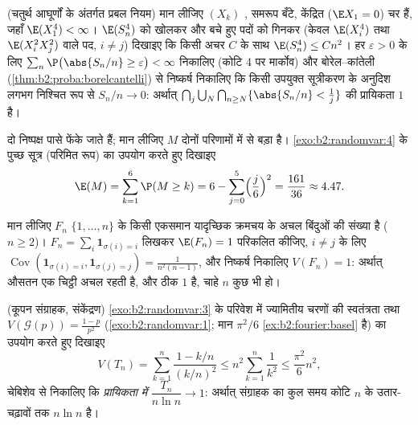 \begin{exercise}[$\star\star\star$]\label{exo:b2:randomvar:9}
(चतुर्थ आघूर्णों के अंतर्गत प्रबल नियम) मान लीजिए $(X_k)$ ,
समरूप बँटे, केंद्रित ($\E X_1 = 0$) चर हैं, जहाँ $\E(X_1^4) < \infty$। $\E(S_n^4)$ को खोलकर और बचे
हुए पदों को गिनकर (केवल $\E(X_i^4)$ तथा $\E(X_i^2X_j^2)$ वाले पद, $i
\neq j$) दिखाइए कि किसी
अचर $C$ के साथ $\E(S_n^4) \leq C n^2$। हर $\varepsilon > 0$ के लिए
$\sum_n \P\bigl(\abs{S_n/n} \geq \varepsilon\bigr) < \infty$
निकालिए (कोटि 4 पर मार्कोव) और बोरेल--कांतेली (\cref{thm:b2:proba:borelcantelli}) से निष्कर्ष
निकालिए कि किसी उपयुक्त सूत्रीकरण के अनुदिश लगभग निश्चित रूप से
$S_n/n \to 0$: अर्थात्  $\bigcap_{j}\bigcup_N\bigcap_{n \geq N}\{\abs{S_n/n} <
\frac1j\}$ की प्रायिकता $1$ है।
\end{exercise}

\begin{exercise}[$\star$]\label{exo:b2:randomvar:10}
दो निष्पक्ष पासे फेंके जाते हैं; मान लीजिए $M$ दोनों परिणामों में
से बड़ा है। \cref{exo:b2:randomvar:4} के पुच्छ सूत्र (परिमित रूप) का उपयोग करते हुए
दिखाइए
\[
\E(M) = \sum_{k=1}^{6}\P(M \geq k)
= 6 - \sum_{j=0}^5\Bigl(\frac j6\Bigr)^2 = \frac{161}{36}
\approx 4.47 .
\]
\end{exercise}

\begin{exercise}[$\star\star$]\label{exo:b2:randomvar:11}
मान लीजिए $F_n$ $\{1, \dots, n\}$ के किसी एकसमान यादृच्छिक क्रमचय के अचल बिंदुओं
की संख्या है ($n \geq 2$)। $F_n =
\sum_i\mathbf 1_{\sigma(i) = i}$ लिखकर $\E(F_n) = 1$ परिकलित कीजिए, $i \neq j$ के लिए $\operatorname{Cov}(\mathbf 1_{\sigma(i)=i}, \mathbf
1_{\sigma(j)=j}) = \frac1{n^2(n-1)}$,
और निष्कर्ष निकालिए $V(F_n) = 1$: अर्थात् औसतन एक चिट्ठी अचल रहती है, और
 ठीक $1$ है, चाहे $n$ कुछ भी हो।
\end{exercise}

\begin{exercise}[$\star\star\star$]\label{exo:b2:randomvar:12}
(कूपन संग्राहक, संकेंद्रण) \cref{exo:b2:randomvar:3} के परिवेश में ज्यामितीय चरणों की
स्वतंत्रता तथा $V(\mathcal
G(p)) = \frac{1-p}{p^2}$ (\cref{exo:b2:randomvar:1}; मान $\pi^2/6$ \cref{ex:b2:fourier:basel} है) का उपयोग करते हुए दिखाइए
\[
V(T_n) = \sum_{k=1}^n\frac{1 - k/n}{(k/n)^2}
\leq n^2\sum_{k=1}^n\frac{1}{k^2} \leq \frac{\pi^2}{6}n^2,
\]
चेबिशेव से निकालिए कि \emph{प्रायिकता में} $\dfrac{T_n}{n\ln n} \to 1$: अर्थात् संग्राहक का
कुल समय कोटि $n$ के उतार-चढ़ावों तक $n\ln n$ है।
\end{exercise}


